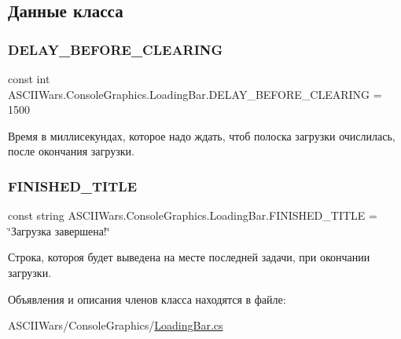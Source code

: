 \subsection{Данные класса}
\hypertarget{class_a_s_c_i_i_wars_1_1_console_graphics_1_1_loading_bar_ae05f622988d5cebaa3e0c14d45d832fb}{}\label{class_a_s_c_i_i_wars_1_1_console_graphics_1_1_loading_bar_ae05f622988d5cebaa3e0c14d45d832fb} 
\subsubsection{\texorpdfstring{D\+E\+L\+A\+Y\+\_\+\+B\+E\+F\+O\+R\+E\+\_\+\+C\+L\+E\+A\+R\+I\+NG}{DELAY\_BEFORE\_CLEARING}}
{\footnotesize\ttfamily const int A\+S\+C\+I\+I\+Wars.\+Console\+Graphics.\+Loading\+Bar.\+D\+E\+L\+A\+Y\+\_\+\+B\+E\+F\+O\+R\+E\+\_\+\+C\+L\+E\+A\+R\+I\+NG = 1500\hspace{0.3cm}{\ttfamily [private]}}

Время в миллисекундах, которое надо ждать, чтоб полоска загрузки очислилась, после окончания загрузки. \hypertarget{class_a_s_c_i_i_wars_1_1_console_graphics_1_1_loading_bar_aa75543e5166964ca32750bb66591ab3d}{}\label{class_a_s_c_i_i_wars_1_1_console_graphics_1_1_loading_bar_aa75543e5166964ca32750bb66591ab3d} 
\subsubsection{\texorpdfstring{F\+I\+N\+I\+S\+H\+E\+D\+\_\+\+T\+I\+T\+LE}{FINISHED\_TITLE}}
{\footnotesize\ttfamily const string A\+S\+C\+I\+I\+Wars.\+Console\+Graphics.\+Loading\+Bar.\+F\+I\+N\+I\+S\+H\+E\+D\+\_\+\+T\+I\+T\+LE = \char`\"{}Загрузка завершена!\char`\"{}\hspace{0.3cm}{\ttfamily [private]}}

Строка, котороя будет выведена на месте последней задачи, при окончании загрузки. 

Объявления и описания членов класса находятся в файле\+:\begin{DoxyCompactItemize}
\item 
A\+S\+C\+I\+I\+Wars/\+Console\+Graphics/\hyperlink{_loading_bar_8cs}{Loading\+Bar.\+cs}\end{DoxyCompactItemize}
